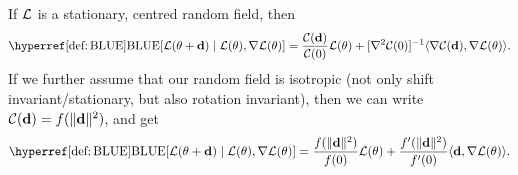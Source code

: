 \begin{lemma}
	If \(\mathcal{L}\) is a stationary, centred random field, then
	\begin{equation*}
		\BLUE[\Loss(\param + \step)\mid \Loss(\param), \nabla\Loss(\param)]
		= \frac{\C(\step)}{\C(0)} \Loss(\param)
		+ [\nabla^2\C(0)]^{-1} \langle \nabla \C(\step), \nabla\Loss(\param)\rangle.
	\end{equation*}
	If we further assume that our random field is isotropic (not only shift
	invariant/stationary, but also rotation invariant), then we can
	write \(\mathcal{C}(\mathbf{d})=f(\|\mathbf{d}\|^2)\), and get
	\begin{equation*}
		\BLUE[\Loss(\param + \step)\mid \Loss(\param), \nabla\Loss(\param)]
		= \frac{f(\|\step\|^2)}{f(0)} \Loss(\param)
		+ \frac{f'(\|\step\|^2)}{f'(0)} \langle \step, \nabla\Loss(\param)\rangle.
	\end{equation*}
\end{lemma}
